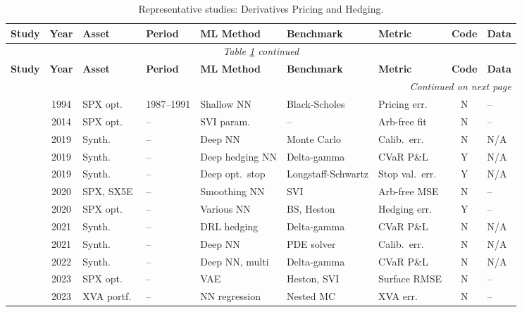\begin{longtable}{@{}p{2.4cm} c p{1.0cm} p{1.0cm} p{2.0cm} p{1.9cm} p{1.4cm} c p{1.4cm}@{}}
\caption{Representative studies: Derivatives Pricing and Hedging.}\label{tab:master_derivatives} \\
\toprule
\textbf{Study} & \textbf{Year} & \textbf{Asset} & \textbf{Period} & \textbf{ML Method} & \textbf{Benchmark} & \textbf{Metric} & \textbf{Code} & \textbf{Data} \\
\midrule
\endfirsthead
\multicolumn{9}{c}{\textit{Table \ref{tab:master_derivatives} continued}} \\
\toprule
\textbf{Study} & \textbf{Year} & \textbf{Asset} & \textbf{Period} & \textbf{ML Method} & \textbf{Benchmark} & \textbf{Metric} & \textbf{Code} & \textbf{Data} \\
\midrule
\endhead
\midrule
\multicolumn{9}{r}{\textit{Continued on next page}} \\
\endfoot
\bottomrule
\endlastfoot

\citet{Hutchinson1994} & 1994 & SPX opt.\ & 1987--1991 & Shallow NN       & Black-Scholes & Pricing err.\ & N & --   \\
\citet{Gatheral2014}   & 2014 & SPX opt.\ & --         & SVI param.\      & --            & Arb-free fit  & N & --   \\
\citet{Bayer2019}      & 2019 & Synth.\    & --         & Deep NN          & Monte Carlo   & Calib.\ err.\ & N & N/A \\
\citet{Buehler2019}    & 2019 & Synth.\    & --         & Deep hedging NN  & Delta-gamma   & CVaR P\&L     & Y & N/A  \\
\citet{Becker2019}     & 2019 & Synth.\    & --         & Deep opt.\ stop  & Longstaff-Schwartz & Stop val.\ err.\ & Y & N/A \\
\citet{Ackerer2020}    & 2020 & SPX, SX5E & --         & Smoothing NN     & SVI           & Arb-free MSE  & N & --   \\
\citet{Ruf2020}        & 2020 & SPX opt.\ & --         & Various NN       & BS, Heston    & Hedging err.\ & Y & --   \\
\citet{Cao2021}        & 2021 & Synth.\    & --         & DRL hedging      & Delta-gamma   & CVaR P\&L     & N & N/A  \\
\citet{Horvath2021}    & 2021 & Synth.\    & --         & Deep NN          & PDE solver    & Calib.\ err.\ & N & N/A \\
\citet{Murray2022}     & 2022 & Synth.\    & --         & Deep NN, multi   & Delta-gamma   & CVaR P\&L     & N & N/A  \\
\citet{Cohen2023}      & 2023 & SPX opt.\ & --         & VAE              & Heston, SVI   & Surface RMSE  & N & --   \\
\citet{Gnoatto2023}    & 2023 & XVA portf.\ & --       & NN regression    & Nested MC     & XVA err.\     & N & --   \\

\end{longtable}

